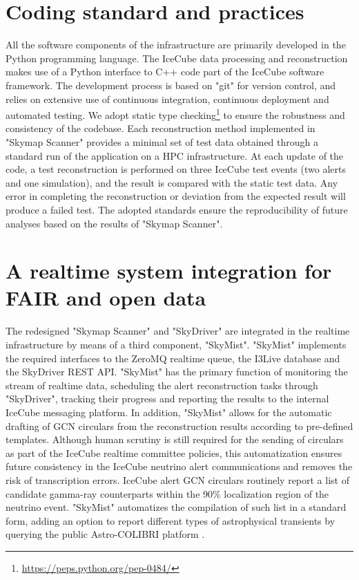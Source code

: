 \documentclass[a4paper,11pt]{article}
\begin{document}
\section{Coding standard and practices}

All the software components of the infrastructure are primarily developed in the Python programming language. The IceCube data processing and reconstruction makes use of a Python interface to C++ code part of the IceCube software framework. The development process is based on "git" for version control, and relies on extensive use of continuous integration, continuous deployment and automated testing. We adopt static type checking\footnote{\url{https://peps.python.org/pep-0484/}} to ensure the robustness and consistency of the codebase. Each reconstruction method implemented in "Skymap Scanner" provides a minimal set of test data obtained through a standard run of the application on a HPC infrastructure. At each update of the code, a test reconstruction is performed on three IceCube test events (two alerts and one simulation), and the result is compared with the static test data. Any error in completing the reconstruction or deviation from the expected result will produce a failed test. The adopted standards ensure the reproducibility of future analyses based on the results of "Skymap Scanner".

\section{A realtime system integration for FAIR and open data}

The redesigned "Skymap Scanner" and "SkyDriver" are integrated in the realtime infrastructure by means of a third component, "SkyMist". "SkyMist" implements the required interfaces to the ZeroMQ realtime queue, the I3Live database and the SkyDriver REST API. "SkyMist" has the primary function of monitoring the stream of realtime data, scheduling the alert reconstruction tasks through "SkyDriver", tracking their progress and reporting the results to the internal IceCube messaging platform. In addition, "SkyMist" allows for the automatic drafting of GCN circulars from the reconstruction results according to pre-defined templates. Although human scrutiny is still required for the sending of circulars as part of the IceCube realtime committee policies, this automatization ensures future consistency in the IceCube neutrino alert communications and removes the risk of transcription errors. IceCube alert GCN circulars routinely report a list of candidate gamma-ray counterparts within the 90\% localization region of the neutrino event. "SkyMist" automatizes the compilation of such list in a standard form, adding an option to report different types of astrophysical transients by querying the public Astro-COLIBRI platform \cite{Reichherzer:2022msg}.
\end{document}

